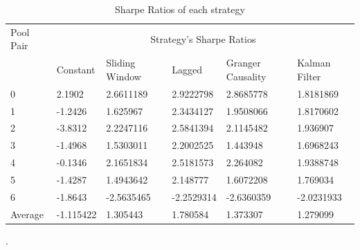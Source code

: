 \begin{table}[!htb]
    \centering
    \begin{adjustwidth}{-0.8in}{-0.9in}
        \begin{tabular}{|p{5em}|p{7em}|p{7em}|p{7em}|p{8em}|p{7em}|}\hline
            Pool Pair & \multicolumn{5}{|c|}{Strategy's Sharpe Ratios} \\\cline{1-6}
            & Constant & Sliding Window & Lagged & Granger Causality & Kalman Filter\\\cline{2-6}
            0 & 2.1902 & 2.6611189 & 2.9222798 & 2.8685778 & 1.8181869\\\cline{2-6}
            1 & -1.2426 & 1.625967 & 2.3434127 & 1.9508066 & 1.8170602\\\cline{2-6}
            2 & -3.8312 & 2.2247116 & 2.5841394 & 2.1145482 & 1.936907\\\cline{2-6}
            3 & -1.4968 & 1.5303011 & 2.2002525 & 1.443948 & 1.6968243\\\cline{2-6}
            4 & -0.1346 & 2.1651834 & 2.5181573 & 2.264082 & 1.9388748\\\cline{2-6}
            5 & -1.4287 & 1.4943642 & 2.148777 & 1.6072208 & 1.769034\\\cline{2-6}
            6 & -1.8643 & -2.5635465 & -2.2529314 & -2.6360359 & -2.0231933\\\hline\hline
            Average & -1.115422 & 1.305443 & 1.780584 & 1.373307 & 1.279099 \\\hline
        \end{tabular}
    \end{adjustwidth}
    \caption{Sharpe Ratios of each strategy \label{tab:sharpes}}.
\end{table}

